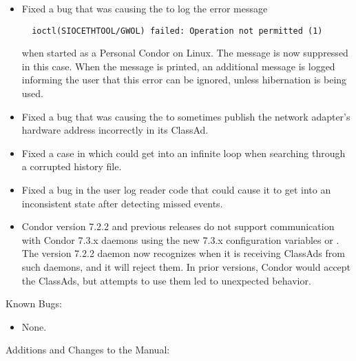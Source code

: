 \begin{itemize}
\item Fixed a bug that was causing the  to log the
  error message 
\begin{verbatim}
  ioctl(SIOCETHTOOL/GWOL) failed: Operation not permitted (1)
\end{verbatim}
  when started as a Personal Condor on Linux.
  The message is now suppressed in this case.  When the message is
  printed, an additional message is logged informing the user that
  this error can be ignored, unless hibernation is being used.

\item Fixed a bug that was causing the  to sometimes
  publish the network adapter's hardware address incorrectly in its
  ClassAd.

\item Fixed a case in which  could get into an infinite
loop when searching through a corrupted history file.

\item Fixed a bug in the user log reader code that could cause it to
  get into an inconsistent state after detecting missed events.

\item Condor version 7.2.2 and previous releases do not support 
  communication with Condor 7.3.x daemons using the new 7.3.x
  configuration variables  or
  .
  The version 7.2.2  daemon now
  recognizes when it is receiving ClassAds from such daemons,
  and it will reject them.
  In prior versions, Condor would accept the ClassAds,
  but attempts to use them led to unexpected behavior.

\end{itemize}

\noindent Known Bugs:

\begin{itemize}

\item None.

\end{itemize}

\noindent Additions and Changes to the Manual:

